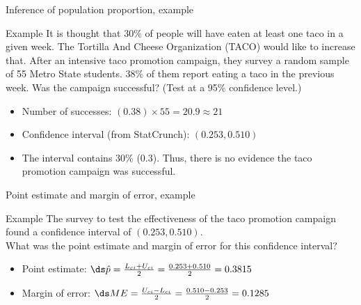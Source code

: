 \documentclass[xcolor=table]{beamer}
\begin{document}
\begin{frame}{Inference of population proportion, example}
\begin{exampleblock}{Example}
\large
It is thought that 30\% of people will have eaten at least one taco in a given week. The Tortilla And Cheese Organization (TACO) would like to increase that. After an intensive taco promotion campaign, they survey a random sample of 55 Metro State students. 38\% of them report eating a taco in the previous week. Was the campaign successful? (Test at a 95\% confidence level.)

\begin{itemize}
\pause\item Number of successes: $(0.38) \times 55 = 20.9 \approx 21$
\pause\item Confidence interval (from StatCrunch): $(0.253, 0.510)$
\pause\item The interval contains 30\% (0.3). Thus, there is no evidence the taco promotion campaign was successful.
\end{itemize}
\end{exampleblock}
\end{frame}

\begin{frame}{Point estimate and margin of error, example}
\begin{exampleblock}{Example}
\large
The survey to test the effectiveness of the taco promotion campaign found a confidence interval of  $(0.253, 0.510)$.\\
\medskip
What was the point estimate and margin of error for this confidence interval?
\begin{itemize}
\pause\item Point estimate: $\ds \hat p = \frac{L_{ci} + U_{ci}}{2} = \frac {0.253 + 0.510}{2 } = 0.3815$
\pause\item Margin of error: $\ds ME = \frac{U_{ci} - L_{ci}}{2} = \frac {0.510 - 0.253}{2} = 0.1285$ 
\end{itemize}
\end{exampleblock}
\end{frame}
\end{document}
